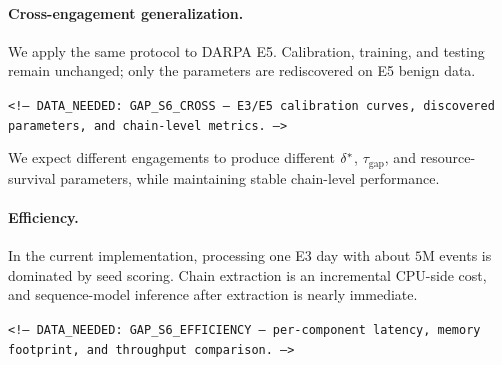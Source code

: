 \paragraph{Cross-engagement generalization.} We apply the same protocol to DARPA E5. Calibration, training, and testing remain unchanged; only the parameters are rediscovered on E5 benign data.
\begin{flushleft}\small\texttt{<!-- DATA\_NEEDED: GAP\_S6\_CROSS --- E3/E5 calibration curves, discovered parameters, and chain-level metrics. -->}\end{flushleft}
We expect different engagements to produce different $\delta^*$, $\tau_{\text{gap}}$, and resource-survival parameters, while maintaining stable chain-level performance.

\paragraph{Efficiency.} In the current implementation, processing one E3 day with about $5$M events is dominated by seed scoring. Chain extraction is an incremental CPU-side cost, and sequence-model inference after extraction is nearly immediate.
\begin{flushleft}\small\texttt{<!-- DATA\_NEEDED: GAP\_S6\_EFFICIENCY --- per-component latency, memory footprint, and throughput comparison. -->}\end{flushleft}
